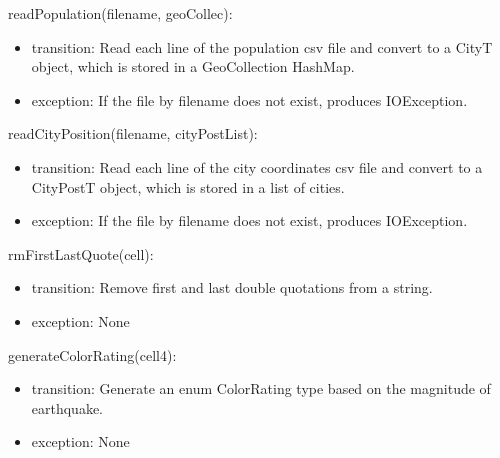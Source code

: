 \documentclass[12pt]{article}
\begin{document}
\noindent readPopulation(filename, geoCollec):
\begin{itemize}
\item transition: Read each line of the population csv file and convert to a CityT object, which is stored in a GeoCollection HashMap.
\item exception: If the file by filename does not exist, produces IOException.
\end{itemize}

\noindent readCityPosition(filename, cityPostList):
\begin{itemize}
\item transition: Read each line of the city coordinates csv file and convert to a CityPostT object,
 which is stored in a list of cities.
\item exception: If the file by filename does not exist, produces IOException.
\end{itemize}

\noindent rmFirstLastQuote(cell):
\begin{itemize}
\item transition: Remove first and last double quotations from a string.
\item exception: None
\end{itemize}

\noindent generateColorRating(cell4):
\begin{itemize}
\item transition: Generate an enum ColorRating type based on the magnitude of earthquake.
\item exception: None
\end{itemize}
\end{document}
